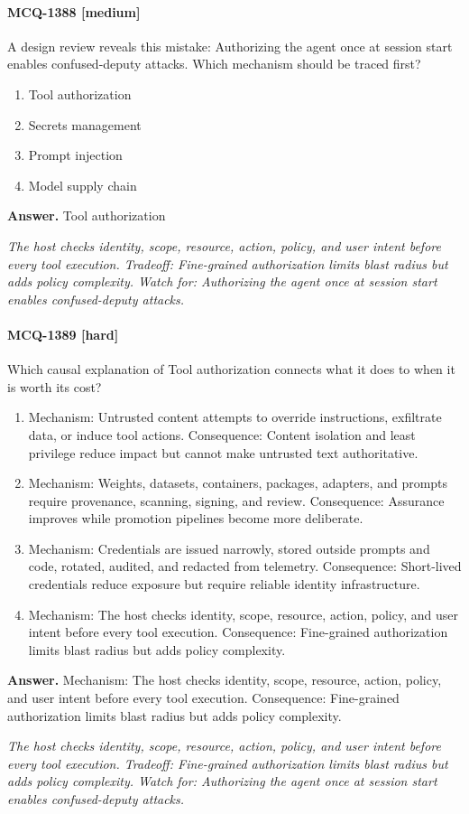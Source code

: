 \paragraph{MCQ-1388 [medium]} A design review reveals this mistake: Authorizing the agent once at session start enables confused-deputy attacks. Which mechanism should be traced first?
\begin{enumerate}[label=\Alph*.]
\item Tool authorization
\item Secrets management
\item Prompt injection
\item Model supply chain
\end{enumerate}
\noindent\textbf{Answer.} Tool authorization
\par\textit{The host checks identity, scope, resource, action, policy, and user intent before every tool execution. Tradeoff: Fine-grained authorization limits blast radius but adds policy complexity. Watch for: Authorizing the agent once at session start enables confused-deputy attacks.}
\paragraph{MCQ-1389 [hard]} Which causal explanation of Tool authorization connects what it does to when it is worth its cost?
\begin{enumerate}[label=\Alph*.]
\item Mechanism: Untrusted content attempts to override instructions, exfiltrate data, or induce tool actions. Consequence: Content isolation and least privilege reduce impact but cannot make untrusted text authoritative.
\item Mechanism: Weights, datasets, containers, packages, adapters, and prompts require provenance, scanning, signing, and review. Consequence: Assurance improves while promotion pipelines become more deliberate.
\item Mechanism: Credentials are issued narrowly, stored outside prompts and code, rotated, audited, and redacted from telemetry. Consequence: Short-lived credentials reduce exposure but require reliable identity infrastructure.
\item Mechanism: The host checks identity, scope, resource, action, policy, and user intent before every tool execution. Consequence: Fine-grained authorization limits blast radius but adds policy complexity.
\end{enumerate}
\noindent\textbf{Answer.} Mechanism: The host checks identity, scope, resource, action, policy, and user intent before every tool execution. Consequence: Fine-grained authorization limits blast radius but adds policy complexity.
\par\textit{The host checks identity, scope, resource, action, policy, and user intent before every tool execution. Tradeoff: Fine-grained authorization limits blast radius but adds policy complexity. Watch for: Authorizing the agent once at session start enables confused-deputy attacks.}
